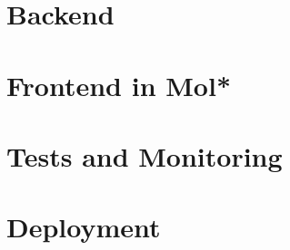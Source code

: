 
\section{Backend}
\label{sec:backend}


\section{Frontend in Mol*}
\label{sec:frontend-molstar}



\section{Tests and Monitoring}
\label{sec:tests-monitoring}



\section{Deployment}
\label{sec:deployment}

